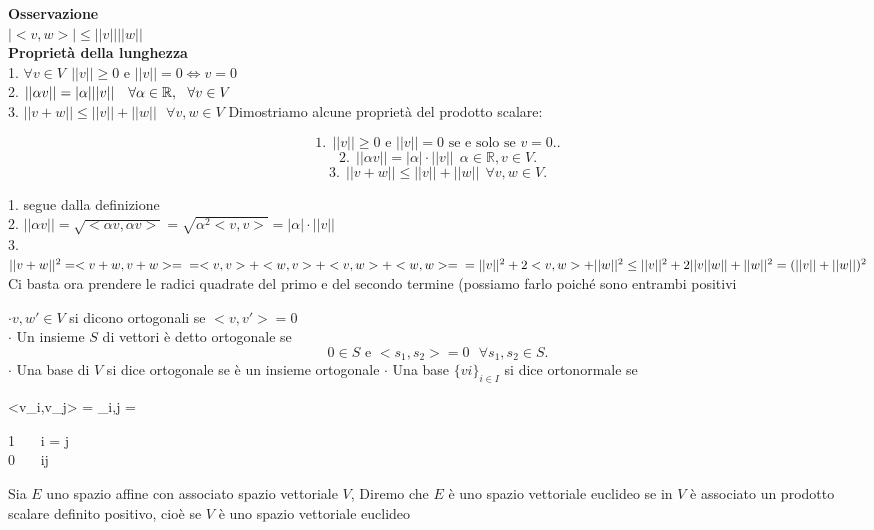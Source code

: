 \documentclass[12px]{article}
\begin{document}
\textbf{Osservazione}\\
$|<v,w>|\leq ||v||||w||$\\
\textbf{Proprietà della lunghezza}\\
1. $\forall v\in V \ \ ||v|| \geq 0$ e $||v|| = 0 \Leftrightarrow v = 0$\\
2. $||\alpha v|| = |\alpha| ||v||\ \ \ \forall \alpha\in \mathbb{R}, \ \ \forall v\in V$ \\
3. $||v+w|| \leq ||v|| + ||w|| \ \ \ \forall v,w\in V$
\newpage
Dimostriamo alcune proprietà del prodotto scalare: 
\begin{lemm} 
	\[
	1. \ \ ||v|| \geq 0 \text{ e } ||v|| = 0 \text{ se e solo se } v = 0. .\]
\[
	2. \ \ ||\alpha v|| = |\alpha| \cdot ||v|| \ \ \alpha\in \mathbb{R}, v\in V
.\] 
\[
3. \ \ ||v + w|| \leq ||v|| + ||w|| \ \ \forall v, w\in V
.\] 
\end{lemm}
\begin{dimo}
	1. segue dalla definizione \\
	2. $||\alpha v|| = \sqrt{<\alpha v,\alpha v>} = \sqrt{\alpha^2 <v,v>} = |\alpha| \cdot ||v||$ \\
	3. $||v + w||^2 = <v+w,v+w> = \\ = <v,v> + <w,v> + <v,w> + <w,w> = \\ = ||v||^2 + 2<v,w> + ||w||^2 \leq ||v||^2 + 2||v||w|| + ||w||^2 = (||v|| + ||w||)^2$ \\
	Ci basta ora prendere le radici quadrate del primo e del secondo termine (possiamo farlo poiché sono entrambi positivi
\end{dimo}
\begin{nome}
	$\cdot v,w'\in V$ si dicono ortogonali se $<v,v'>=0$ \\
	$\cdot$ Un insieme $S$ di vettori è detto ortogonale se \[
		0\in S \text{ e } <s_1,s_2> = 0 \ \ \ \forall s_1,s_2 \in S
	.\] 
	$\cdot$ Una base di $V$ si dice ortogonale se è un insieme ortogonale
	$\cdot$ Una base $\{vi\}_{i\in I}$ si dice ortonormale se 
	\begin{aligned}
		<v_i,v_j> = \delta_{i,j} =
		\begin{sistema}
			1 \ \ \ i = j \\
			0 \ \ \ i\neq j
		\end{sistema}
	\end{aligned}
\end{nome}
\begin{defi}
	Sia $E$ uno spazio affine con associato spazio vettoriale $V$, Diremo che $E$ è uno spazio vettoriale euclideo se in $V$ è associato un prodotto scalare definito positivo, cioè se $V$ è uno spazio vettoriale euclideo
\end{defi}
\end{document}
